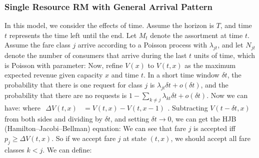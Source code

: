 \documentclass[12pt]{report}
\begin{document}
\subsubsection{Single Resource RM with General Arrival Pattern}
In this model, we consider the effects of time. Assume the horizon is $T$, and time $t$ represents the time left until the end.
Let $M_t$ denote the assortment at time $t$. Assume the fare class $j$ arrive according to a Poisson process with $\lambda_{jt}$, and let $N_{jt}$ denote
the number of consumers that arrive during the last $t$ units of time, which is Poisson with parameter:
Now, refine $V(x)$ to $V(t, x)$ as the maximum expected revenue given capacity $x$ and time $t$. In a short time window $\delta t$, the probability that there is one request for class $j$ is $\lambda_{jt}\delta t+o(\delta t)$,
and the probability that there are no requests is $1-\sum_{k\neq j}\lambda_{kt}\delta t+o(\delta t)$. Now we can have:
where $\begin{aligned}\Delta V(t,x)&=V(t,x)-V(t,x-1)\end{aligned}$. Subtracting $V(t-\delta t,x)$ from both sides and dividing by $\delta t$, and setting $\delta t\to 0$, we can get the HJB (Hamilton–Jacobi–Bellman) equation:
We can see that fare $j$ is accepted iff $p_j\geq\Delta V(t,x)$. So if we accept fare $j$ at state $(t, x)$, we should accept all fare classes $k<j$. We can define:
\end{document}
